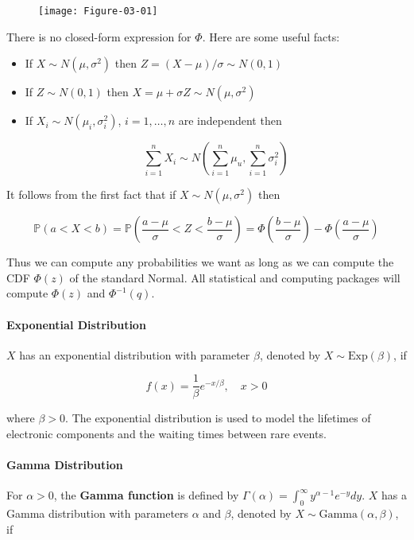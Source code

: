 \begin{figure}[H]
\texttt{[image: Figure-03-01]}
\end{figure}

There is no closed-form expression for \(\Phi\). Here are some useful
facts:

\begin{itemize}
\item
  If \(X \sim N(\mu, \sigma^2)\) then
  \(Z = (X - \mu) / \sigma \sim N(0, 1)\)
\item
  If \(Z \sim N(0, 1)\) then
  \(X = \mu + \sigma Z \sim N(\mu, \sigma^2)\)
\item
  If \(X_i \sim N(\mu_i, \sigma_i^2)\), \(i = 1, \dots, n\) are
  independent then

  \[ \sum_{i=1}^n X_i \sim N \left(\sum_{i=1}^n \mu_u, \sum_{i=1}^n \sigma_i^2 \right) \]
\end{itemize}

It follows from the first fact that if \(X \sim N(\mu, \sigma^2)\) then

\[ \mathbb{P}(a < X < b) = \mathbb{P}\left( \frac{a - \mu}{\sigma} < Z < \frac{b - \mu}{\sigma} \right) 
= \Phi \left( \frac{b - \mu}{\sigma} \right) - \Phi \left( \frac{a - \mu}{\sigma} \right) \]

Thus we can compute any probabilities we want as long as we can compute
the CDF \(\Phi(z)\) of the standard Normal. All statistical and
computing packages will compute \(\Phi(z)\) and \(\Phi^{-1}(q)\).

\paragraph{Exponential Distribution}\label{exponential-distribution}

\(X\) has an exponential distribution with parameter \(\beta\), denoted
by \(X \sim \text{Exp}(\beta)\), if

\[ f(x) = \frac{1}{\beta} e^{-x / \beta}, \quad x > 0 \]

where \(\beta > 0\). The exponential distribution is used to model the
lifetimes of electronic components and the waiting times between rare
events.

\paragraph{Gamma Distribution}\label{gamma-distribution}

For \(\alpha > 0\), the \textbf{Gamma function} is defined by
\(\Gamma(\alpha) = \int_0^\infty y^{\alpha - 1} e^{-y} dy\). \(X\) has a
Gamma distribution with parameters \(\alpha\) and \(\beta\), denoted by
\(X \sim \text{Gamma}(\alpha, \beta)\), if

